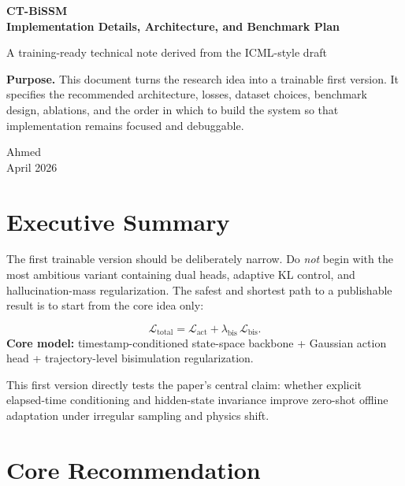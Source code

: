\documentclass[11pt]{article}
\begin{document}
\begin{titlepage}
\centering
\vspace*{2.0cm}
{\Huge\bfseries\color{accent} CT-BiSSM\\[0.3em]Implementation Details, Architecture, and Benchmark Plan\par}
\vspace{1.0cm}
{\Large A training-ready technical note derived from the ICML-style draft\par}
\vspace{1.6cm}
\begin{tcolorbox}[colback=soft,colframe=rule,width=0.9\textwidth,arc=2mm]
\textbf{Purpose.} This document turns the research idea into a trainable first version. It specifies the recommended architecture, losses, dataset choices, benchmark design, ablations, and the order in which to build the system so that implementation remains focused and debuggable.
\end{tcolorbox}
\vfill
{\large Ahmed\\April 2026\par}
\end{titlepage}

\section{Executive Summary}

The first trainable version should be deliberately narrow. Do \emph{not} begin with the most ambitious variant containing dual heads, adaptive KL control, and hallucination-mass regularization. The safest and shortest path to a publishable result is to start from the core idea only:

\begin{tcolorbox}[colback=soft,colframe=rule,arc=2mm]
\[
\mathcal{L}_{\text{total}} = \mathcal{L}_{\text{act}} + \lambda_{\text{bis}}\,\mathcal{L}_{\text{bis}}.
\]
\textbf{Core model:} timestamp-conditioned state-space backbone + Gaussian action head + trajectory-level bisimulation regularization.
\end{tcolorbox}

This first version directly tests the paper's central claim: whether explicit elapsed-time conditioning and hidden-state invariance improve zero-shot offline adaptation under irregular sampling and physics shift.

\section{Core Recommendation}
\end{document}
